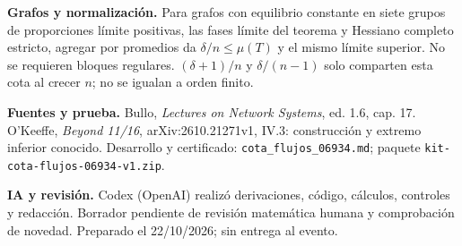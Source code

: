 \documentclass[12pt]{article}
\begin{document}
\vspace{2mm}
{\fontsize{19}{24}\selectfont
\textbf{Grafos y normalización.} Para grafos con equilibrio constante en siete grupos de proporciones límite positivas, las fases límite del teorema y Hessiano completo estricto, agregar por promedios da $\delta/n\leq\mu(T)$ y el mismo límite superior. No se requieren bloques regulares. $(\delta+1)/n$ y $\delta/(n-1)$ solo comparten esta cota al crecer $n$; no se igualan a orden finito.
\par
\textbf{Fuentes y prueba.} Bullo, \textit{Lectures on Network Systems}, ed. 1.6, cap. 17. O'Keeffe, \textit{Beyond 11/16}, arXiv:2610.21271v1, IV.3: construcción y extremo inferior conocido. Desarrollo y certificado: \texttt{cota\_flujos\_06934.md}; paquete \texttt{kit-cota-flujos-06934-v1.zip}.
\par
\textbf{IA y revisión.} Codex (OpenAI) realizó derivaciones, código, cálculos, controles y redacción. Borrador pendiente de revisión matemática humana y comprobación de novedad. Preparado el 22/10/2026; sin entrega al evento.
}
\end{document}
